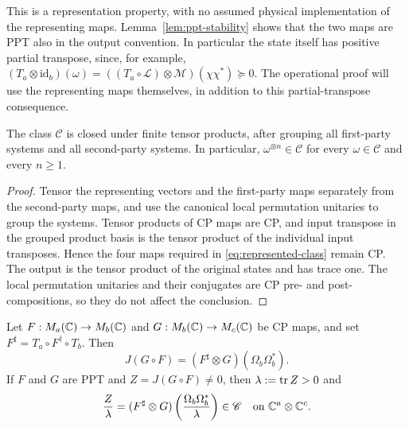 This is a representation property, with no assumed physical implementation
of the representing maps.  Lemma~\ref{lem:ppt-stability} shows that the two
maps are PPT also in the output convention.  In particular the state itself
has positive partial transpose, since, for example,
$(T_a\otimes\mathrm{id}_b)(\omega)=
 ((T_a\circ\mathcal L)\otimes\mathcal M)(\chi\chi^*)\succeq0$.
The operational proof will use the representing maps themselves, in
addition to this partial-transpose consequence.

\begin{lemma}\label{lem:tensor-closure}
The class $\mathscr C$ is closed under finite tensor products, after
grouping all first-party systems and all second-party systems.  In
particular, $\omega^{\otimes n}\in\mathscr C$ for every
$\omega\in\mathscr C$ and every $n\geq1$.
\end{lemma}

\begin{proof}
Tensor the representing vectors and the first-party maps separately from
the second-party maps, and use the canonical local permutation unitaries to
group the systems.  Tensor products of CP maps are CP, and input transpose
in the grouped product basis is the tensor product of the individual input
transposes.  Hence the four maps required in
\eqref{eq:represented-class} remain CP.  The output is the tensor product of
the original states and has trace one.  The local permutation unitaries and
their conjugates are CP pre- and post-compositions, so they do not affect
the conclusion.
\end{proof}

\begin{lemma}\label{lem:choi-transfer}
Let $F:M_{a}(\mathbb C)\to M_{b}(\mathbb C)$ and $G:M_{b}(\mathbb C)\to M_{c}(\mathbb C)$ be CP maps, and set
$F^\sharp=T_a\circ F^\dagger\circ T_b$.  Then
\begin{equation}\label{eq:choi-transfer}
 J(G\circ F)=(F^\sharp\otimes G)(\Omega_b\Omega_b^*).
\end{equation}
If $F$ and $G$ are PPT and $Z=J(G\circ F)\ne0$, then
$\lambda:=\operatorname{tr} Z>0$ and
\begin{equation}\label{eq:choi-transfer-normalized}
 \frac{Z}{\lambda}
 =(F^\sharp\otimes G)
 \left(\frac{\Omega_b\Omega_b^*}{\lambda}\right)\in\mathscr C
 \quad\text{on }\mathbb C^a\otimes\mathbb C^c.
\end{equation}
\end{lemma}

